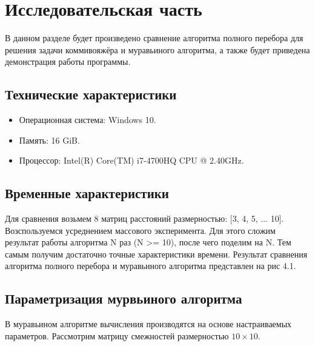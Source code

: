 \chapter{Исследовательская часть}

В данном разделе будет произведено сравнение алгоритма полного перебора для решения задачи коммивояжёра и муравьиного алгоритма, а также будет приведена демонстрация работы программы.



\section{Технические характеристики}

\begin{itemize}
	\item Операционная система: Windows 10. \cite{windows}
	\item Память: 16 GiB.
	\item Процессор: Intel(R) Core(TM) i7-4700HQ CPU @ 2.40GHz. \cite{intel}
\end{itemize}


\section{Временные характеристики}

Для сравнения возьмем 8 матриц расстояний размерностью: [3, 4, 5, ... 10]. Возспользуемся усреднением массового эксперимента. Для этого сложим результат работы алгоритма N раз (N >= 10), после чего поделим на N. Тем самым получим достаточно точные характеристики времени. Результат сравнения алгоритма полного перебора и муравьиного алгоритма представлен на рис 4.1.


\clearpage

\section{Параметризация мурвьиного алгоритма}
В муравьином алгоритме вычисления производятся на основе настраиваемых параметров. Рассмотрим матрицу смежностей размерностью $10\times10$.


